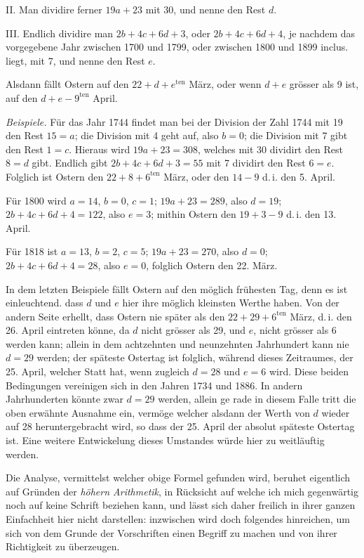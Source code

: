 II. Man dividire ferner $19a+23$ mit 30, und nenne den Rest $d$.

III. Endlich dividire man $2b+4c+6d+3$, oder $2b+4c+6d+4$, je
nachdem das vorgegebene Jahr zwischen 1700 und 1799, oder zwischen 1800
und 1899 inclus. liegt, mit 7, und nenne den Rest $e$.

Alsdann fällt Ostern auf den $22+d+e^{\mathrm{ten}}$ März, oder wenn $d+e$ grösser
als 9 ist, auf den $d+e-9^{\mathrm{ten}}$ April.

\textit{Beispiele.} Für das Jahr 1744 findet man bei der Division der Zahl 1744
mit 19 den Rest $15=a$; die Division mit 4 geht auf, also $b=0$; die Division
mit 7 gibt den Rest $1=c$. Hieraus wird $19a+23=308$, welches mit
30 dividirt den Rest $8=d$ gibt. Endlich gibt $2b+4c+6d+3=55$ mit 7
dividirt den Rest $6=e$. Folglich ist Ostern den $22+8+6^{\mathrm{ten}}$ März, oder den
$14-9$ d.\,i. den 5. April.

Für 1800 wird $a=14$, $b=0$, $c=1$; $19a+23=289$, also $d=19$;
$2b+4c+6d+4=122$, also $e=3$; mithin Ostern den $19+3-9$ d.\,i. den
13. April.

Für 1818 ist $a=13$, $b=2$, $c=5$; $19a+23=270$, also $d=0$;
$2b+4c+6d+4=28$, also $e=0$, folglich Ostern den 22. März.

In dem letzten Beispiele fällt Ostern auf den möglich frühesten Tag, denn
es ist einleuchtend. dass $d$ und $e$ hier ihre möglich kleinsten Werthe haben.
Von der andern Seite erhellt, dass Ostern nie später als den $22+29+6^{\mathrm{ten}}$ März,
d.\,i. den 26. April eintreten könne, da $d$ nicht grösser als 29, und $e$, nicht
grösser als 6 werden kann; allein in dem achtzehnten und neunzehnten Jahrhundert
kann nie $d=29$ werden; der späteste Ostertag ist folglich, während
dieses Zeitraumes, der 25. April, welcher Statt hat, wenn zugleich $d=28$ und
$e=6$ wird. Diese beiden Bedingungen vereinigen sich in den Jahren 1734
und 1886. In andern Jahrhunderten könnte zwar $d=29$ werden, allein ge%
%
rade in diesem Falle tritt die oben erwähnte Ausnahme ein, vermöge welcher alsdann
der Werth von $d$ wieder auf 28 heruntergebracht wird, so dass der 25.
April der absolut späteste Ostertag ist. Eine weitere Entwickelung dieses Umstandes
würde hier zu weitläuftig werden.

Die Analyse, vermittelst welcher obige Formel gefunden wird, beruhet eigentlich
auf Gründen der \textit{höhern Arithmetik}, in Rücksicht auf welche ich mich
gegenwärtig noch auf keine Schrift beziehen kann, und lässt sich daher freilich
in ihrer ganzen Einfachheit hier nicht darstellen: inzwischen wird doch folgendes
hinreichen, um sich von dem Grunde der Vorschriften einen Begriff zu machen
und von ihrer Richtigkeit zu überzeugen.

